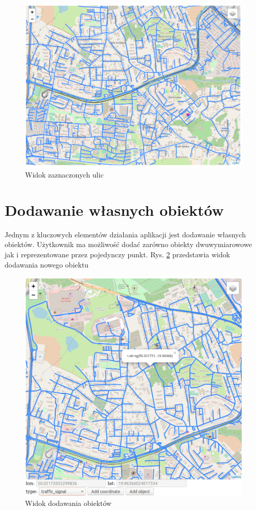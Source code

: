 \begin{figure}[h]
\caption{Widok zaznaczonych ulic}
\label{sec:onlyStreetMap}
\centering
\includegraphics[width=1.03\textwidth]{onlyStreet}
\end{figure}

\newpage
\section{Dodawanie własnych obiektów}
\label{sec:addedCustomObjects}

Jednym z kluczowych elementów działania aplikacji jest dodawanie własnych obiektów. Użytkownik ma możliwość dodać zarówno obiekty dwuwymiarowowe jak i reprezentowane przez pojedynczy punkt. Rys. \ref{sec:addObject} przedstawia widok dodawania nowego obiektu

\begin{figure}[h]
\caption{Widok dodawania obiektów}
\label{sec:addObject}
\centering
\includegraphics[width=1.07\textwidth]{addObject}
\end{figure}

